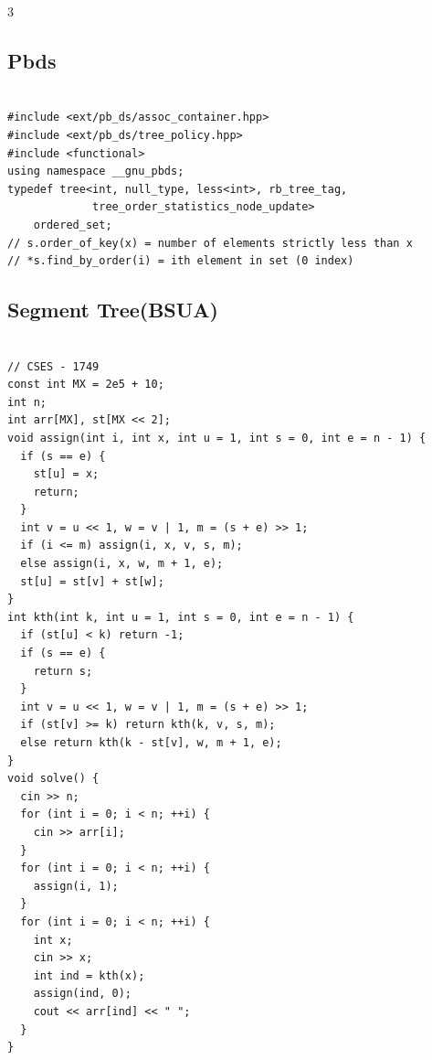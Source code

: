\documentclass[10pt, landscape, a4paper, onesided]{extarticle}
\begin{document}
\begin{multicols*}{3}
\subsection{Pbds}
\begin{verbatim}

#include <ext/pb_ds/assoc_container.hpp>
#include <ext/pb_ds/tree_policy.hpp>
#include <functional>
using namespace __gnu_pbds;
typedef tree<int, null_type, less<int>, rb_tree_tag,
             tree_order_statistics_node_update>
    ordered_set;
// s.order_of_key(x) = number of elements strictly less than x
// *s.find_by_order(i) = ith element in set (0 index)
\end{verbatim}

\subsection{Segment Tree(BSUA)}
\begin{verbatim}

// CSES - 1749
const int MX = 2e5 + 10;
int n;
int arr[MX], st[MX << 2];
void assign(int i, int x, int u = 1, int s = 0, int e = n - 1) {
  if (s == e) {
    st[u] = x;
    return;
  }
  int v = u << 1, w = v | 1, m = (s + e) >> 1;
  if (i <= m) assign(i, x, v, s, m);
  else assign(i, x, w, m + 1, e);
  st[u] = st[v] + st[w];
}
int kth(int k, int u = 1, int s = 0, int e = n - 1) {
  if (st[u] < k) return -1;
  if (s == e) {
    return s;
  }
  int v = u << 1, w = v | 1, m = (s + e) >> 1;
  if (st[v] >= k) return kth(k, v, s, m);
  else return kth(k - st[v], w, m + 1, e);
}
void solve() {
  cin >> n;
  for (int i = 0; i < n; ++i) {
    cin >> arr[i];
  }
  for (int i = 0; i < n; ++i) {
    assign(i, 1);
  }
  for (int i = 0; i < n; ++i) {
    int x;
    cin >> x;
    int ind = kth(x);
    assign(ind, 0);
    cout << arr[ind] << " ";
  }
}
\end{verbatim}


\end{multicols*}
\end{document}
